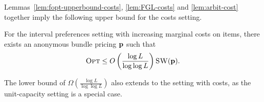 

\noindent
Lemmas~\ref{lem:fopt-upperbound-costs}, \ref{lem:FGL-costs} and
\ref{lem:arbit-cost} together imply the following upper bound for the
costs setting.

\begin{theorem}
\label{thm:costs-ub}
For the interval preferences setting with increasing marginal costs on
items, there exists an anonymous bundle pricing $\mathbf{p}$ such that
\[
    {\normalfont\textsc{Opt}} \le O\left(\frac{\log L}{\log\log L}\right){\normalfont\textsc{SW}}(\mathbf{p}).
\]
\end{theorem}

The lower bound of $\Omega\left(\frac{\log L}{\log\log L}\right)$ also extends
to the setting with costs, as the unit-capacity setting is a special case.
